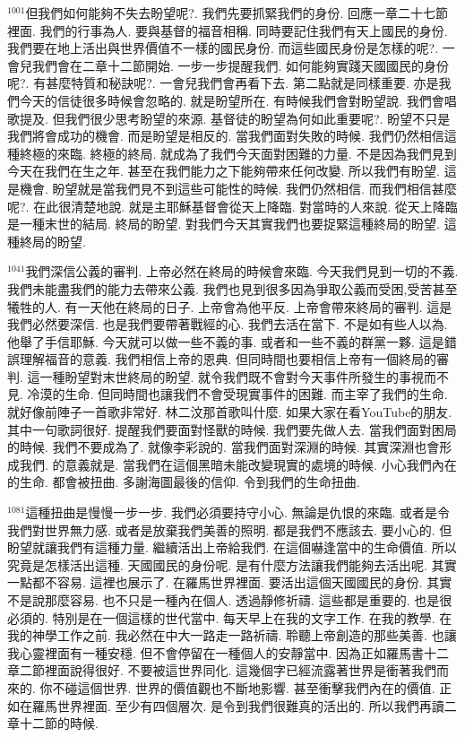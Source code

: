 \documentclass{book}
\begin{document}
$^{1001}$但我們如何能夠不失去盼望呢?.
我們先要抓緊我們的身份.
回應一章二十七節裡面.
我們的行事為人.
要與基督的福音相稱.
同時要記住我們有天上國民的身份.
我們要在地上活出與世界價值不一樣的國民身份.
而這些國民身份是怎樣的呢?.
一會兒我們會在二章十二節開始.
一步一步提醒我們.
如何能夠實踐天國國民的身份呢?.
有甚麼特質和秘訣呢?.
一會兒我們會再看下去.
第二點就是同樣重要.
亦是我們今天的信徒很多時候會忽略的.
就是盼望所在.
有時候我們會對盼望說.
我們會唱歌提及.
但我們很少思考盼望的來源.
基督徒的盼望為何如此重要呢?.
盼望不只是我們將會成功的機會.
而是盼望是相反的.
當我們面對失敗的時候.
我們仍然相信這種終極的來臨.
終極的終局.
就成為了我們今天面對困難的力量.
不是因為我們見到今天在我們在生之年.
甚至在我們能力之下能夠帶來任何改變.
所以我們有盼望.
這是機會.
盼望就是當我們見不到這些可能性的時候.
我們仍然相信.
而我們相信甚麼呢?.
在此很清楚地說.
就是主耶穌基督會從天上降臨.
對當時的人來說.
從天上降臨是一種末世的結局.
終局的盼望.
對我們今天其實我們也要捉緊這種終局的盼望.
這種終局的盼望.

$^{1041}$我們深信公義的審判.
上帝必然在終局的時候會來臨.
今天我們見到一切的不義.
我們未能盡我們的能力去帶來公義.
我們也見到很多因為爭取公義而受困,受苦甚至犧牲的人.
有一天他在終局的日子.
上帝會為他平反.
上帝會帶來終局的審判.
這是我們必然要深信.
也是我們要帶著戰經的心.
我們去活在當下.
不是如有些人以為.
他舉了手信耶穌.
今天就可以做一些不義的事.
或者和一些不義的群黨一夥.
這是錯誤理解福音的意義.
我們相信上帝的恩典.
但同時間也要相信上帝有一個終局的審判.
這一種盼望對末世終局的盼望.
就令我們既不會對今天事件所發生的事視而不見.
冷漠的生命.
但同時間也讓我們不會受現實事件的困難.
而主宰了我們的生命.
就好像前陣子一首歌非常好.
林二汶那首歌叫什麼.
如果大家在看YouTube的朋友.
其中一句歌詞很好.
提醒我們要面對怪獸的時候.
我們要先做人去.
當我們面對困局的時候.
我們不要成為了.
就像李彩說的.
當我們面對深淵的時候.
其實深淵也會形成我們.
的意義就是.
當我們在這個黑暗未能改變現實的處境的時候.
小心我們內在的生命.
都會被扭曲.
多謝海圖最後的信仰.
令到我們的生命扭曲.

$^{1081}$這種扭曲是慢慢一步一步.
我們必須要持守小心.
無論是仇恨的來臨.
或者是令我們對世界無力感.
或者是放棄我們美善的照明.
都是我們不應該去.
要小心的.
但盼望就讓我們有這種力量.
繼續活出上帝給我們.
在這個嚇逢當中的生命價值.
所以究竟是怎樣活出這種.
天國國民的身份呢.
是有什麼方法讓我們能夠去活出呢.
其實一點都不容易.
這裡也展示了.
在羅馬世界裡面.
要活出這個天國國民的身份.
其實不是說那麼容易.
也不只是一種內在個人.
透過靜修祈禱.
這些都是重要的.
也是很必須的.
特別是在一個這樣的世代當中.
每天早上在我的文字工作.
在我的教學.
在我的神學工作之前.
我必然在中大一路走一路祈禱.
聆聽上帝創造的那些美善.
也讓我心靈裡面有一種安穩.
但不會停留在一種個人的安靜當中.
因為正如羅馬書十二章二節裡面說得很好.
不要被這世界同化.
這幾個字已經流露著世界是衝著我們而來的.
你不碰這個世界.
世界的價值觀也不斷地影響.
甚至衝擊我們內在的價值.
正如在羅馬世界裡面.
至少有四個層次.
是令到我們很難真的活出的.
所以我們再讀二章十二節的時候.
\end{document}
